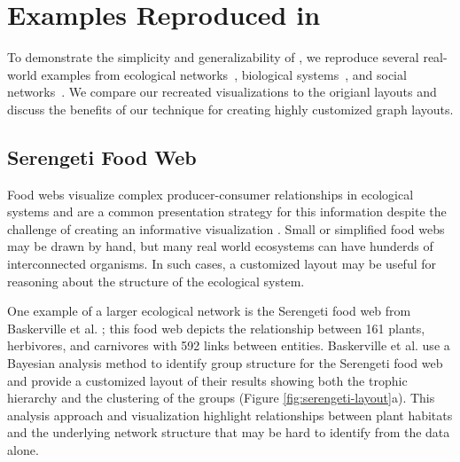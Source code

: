 \section{Examples Reproduced in \projectname}
\label{sec:examples}
To demonstrate the simplicity and generalizability of \projectname, we reproduce several real-world examples from ecological networks~\cite{baskerville2011spatial}, biological systems~\cite{barsky2008cerebral}, and social networks~\cite{rothenberg1998using}. We compare our recreated visualizations to the origianl layouts and discuss the benefits of our technique for creating highly customized graph layouts.






\subsection{Serengeti Food Web}
\serengetiLayout
\serengetiSpec
Food webs visualize complex producer-consumer relationships in ecological systems and are a common presentation strategy for this information \cite{hinke2004visualizing,harper2006dynamic,lavigne1996cod,baskerville2011spatial,yodzis1998local,cohen2003ecological,benson2016higher} despite the challenge of creating an informative visualization \cite{kearney2016blog}. Small or simplified food webs may be drawn by hand, but many real world ecosystems can have hunderds of interconnected organisms. In such cases, a customized layout may be useful for reasoning about the structure of the ecological system.

One example of a larger ecological network is the Serengeti food web from Baskerville et al. \cite{baskerville2011spatial}; this food web depicts the relationship between 161 plants, herbivores, and carnivores with 592 links between entities. Baskerville et al. use a Bayesian analysis method to identify group structure for the Serengeti food web and provide a customized layout of their results showing both the trophic hierarchy and the clustering of the groups (Figure \ref{fig:serengeti-layout}a). This analysis approach and visualization highlight relationships between plant habitats and the underlying network structure that may be hard to identify from the data alone.

